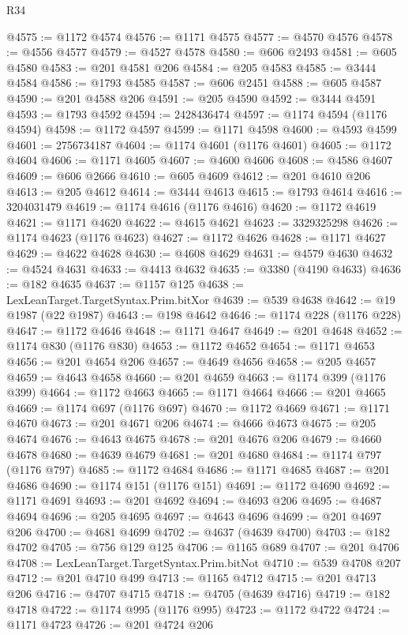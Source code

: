 \begin{lexlean}{R34}
\begin{coremodule}
@4575 := @1172 @4574
@4576 := @1171 @4575
@4577 := @4570 @4576
@4578 := @4556 @4577
@4579 := @4527 @4578
@4580 := @606 @2493
@4581 := @605 @4580
@4583 := @201 @4581 @206
@4584 := @205 @4583
@4585 := @3444 @4584
@4586 := @1793 @4585
@4587 := @606 @2451
@4588 := @605 @4587
@4590 := @201 @4588 @206
@4591 := @205 @4590
@4592 := @3444 @4591
@4593 := @1793 @4592
@4594 := 2428436474
@4597 := @1174 @4594 (@1176 @4594)
@4598 := @1172 @4597
@4599 := @1171 @4598
@4600 := @4593 @4599
@4601 := 2756734187
@4604 := @1174 @4601 (@1176 @4601)
@4605 := @1172 @4604
@4606 := @1171 @4605
@4607 := @4600 @4606
@4608 := @4586 @4607
@4609 := @606 @2666
@4610 := @605 @4609
@4612 := @201 @4610 @206
@4613 := @205 @4612
@4614 := @3444 @4613
@4615 := @1793 @4614
@4616 := 3204031479
@4619 := @1174 @4616 (@1176 @4616)
@4620 := @1172 @4619
@4621 := @1171 @4620
@4622 := @4615 @4621
@4623 := 3329325298
@4626 := @1174 @4623 (@1176 @4623)
@4627 := @1172 @4626
@4628 := @1171 @4627
@4629 := @4622 @4628
@4630 := @4608 @4629
@4631 := @4579 @4630
@4632 := @4524 @4631
@4633 := @4413 @4632
@4635 := @3380 (@4190 @4633)
@4636 := @182 @4635
@4637 := @1157 @125
@4638 := LexLeanTarget.TargetSyntax.Prim.bitXor
@4639 := @539 @4638
@4642 := @19 @1987 (@22 @1987)
@4643 := @198 @4642
@4646 := @1174 @228 (@1176 @228)
@4647 := @1172 @4646
@4648 := @1171 @4647
@4649 := @201 @4648
@4652 := @1174 @830 (@1176 @830)
@4653 := @1172 @4652
@4654 := @1171 @4653
@4656 := @201 @4654 @206
@4657 := @4649 @4656
@4658 := @205 @4657
@4659 := @4643 @4658
@4660 := @201 @4659
@4663 := @1174 @399 (@1176 @399)
@4664 := @1172 @4663
@4665 := @1171 @4664
@4666 := @201 @4665
@4669 := @1174 @697 (@1176 @697)
@4670 := @1172 @4669
@4671 := @1171 @4670
@4673 := @201 @4671 @206
@4674 := @4666 @4673
@4675 := @205 @4674
@4676 := @4643 @4675
@4678 := @201 @4676 @206
@4679 := @4660 @4678
@4680 := @4639 @4679
@4681 := @201 @4680
@4684 := @1174 @797 (@1176 @797)
@4685 := @1172 @4684
@4686 := @1171 @4685
@4687 := @201 @4686
@4690 := @1174 @151 (@1176 @151)
@4691 := @1172 @4690
@4692 := @1171 @4691
@4693 := @201 @4692
@4694 := @4693 @206
@4695 := @4687 @4694
@4696 := @205 @4695
@4697 := @4643 @4696
@4699 := @201 @4697 @206
@4700 := @4681 @4699
@4702 := @4637 (@4639 @4700)
@4703 := @182 @4702
@4705 := @756 @129 @125
@4706 := @1165 @689
@4707 := @201 @4706
@4708 := LexLeanTarget.TargetSyntax.Prim.bitNot
@4710 := @539 @4708 @207
@4712 := @201 @4710 @499
@4713 := @1165 @4712
@4715 := @201 @4713 @206
@4716 := @4707 @4715
@4718 := @4705 (@4639 @4716)
@4719 := @182 @4718
@4722 := @1174 @995 (@1176 @995)
@4723 := @1172 @4722
@4724 := @1171 @4723
@4726 := @201 @4724 @206

\end{coremodule}
\end{lexlean}
